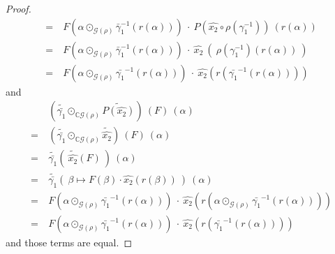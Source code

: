 \documentclass[12pt,a4paper]{scrartcl}
\theoremstyle{plain}
\theoremstyle{definition}
\newcommand{\C}{\mathbb{C}} %
\newcommand{\2}{\mathbb{Z} / 2 \mathbb{Z}}
\newcommand{\G}{\mathcal{G}}
\newcommand{\1}{\bar{1}}
\newcommand{\0}{\bar{0}}
\begin{document}
\begin{proof}
\begin{align*}
		=&~ F(\alpha \odot_{\G (\rho)} \bar\gamma_1^{-1}(r(\alpha))) ~ \cdot ~ P(\widehat{x_2} \circ \rho(\gamma_1^{-1}))~(r(\alpha)) \\
		=&~ F(\alpha \odot_{\G (\rho)} \bar\gamma_1^{-1}(r(\alpha))) ~ \cdot ~ \widehat{x_2} ~(~\rho(\gamma_1^{-1})(r(\alpha))~)	\\
		=&~ F(\alpha \odot_{\G (\rho)} \bar{\gamma_1}^{-1}(r(\alpha))) ~\cdot~ \widehat{x_2}(r(\bar{\gamma_1}^{-1}(r(\alpha))))	
	\end{align*}
	and
	\begin{align*}
		 &~ (\widetilde{\bar{\gamma_1}} \odot_{\C\G(\rho)} \widetilde{P(\widehat{x_2})}) ~(F) ~(\alpha) \\
		=&~ (\widetilde{\bar{\gamma_1}} \odot_{\C\G(\rho)} \widetilde{\widehat{x_2}})~(F)~(\alpha) \\
		=&~ \widetilde{\bar{\gamma_1}} (~ \widetilde{\widehat{x_2}}(F)~)~ (\alpha) \\
		=&~ \widetilde{\bar{\gamma_1}} (~ \beta \mapsto F(\beta) \cdot \widehat{x_2}(r(\beta))~)~ (\alpha) \\
		=&~ F(\alpha \odot_{\G (\rho)} \bar{\gamma_1}^{-1}(r(\alpha))) ~\cdot~ \widehat{x_2}(r(\alpha \odot_{\G (\rho)} \bar{\gamma_1}^{-1}(r(\alpha)))) \\
		=&~ F(\alpha \odot_{\G (\rho)} \bar{\gamma_1}^{-1}(r(\alpha))) ~\cdot~ \widehat{x_2}(r(\bar{\gamma_1}^{-1}(r(\alpha))))
	\end{align*}
	and those terms are equal.
	

\end{proof}
\end{document}
